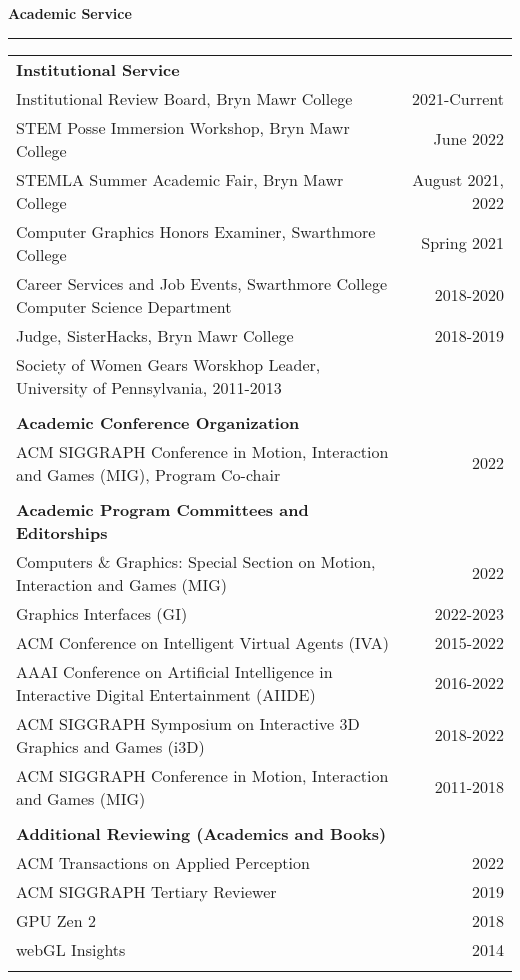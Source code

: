 \needspace{6em}
{\large {\bf Academic Service}}
\vspace{0.1cm}
\hrule
\medskip
\begin{tabular*}{7.1in}{@{}l@{\extracolsep\fill}r}

{\bf Institutional Service } & \\
Institutional Review Board, Bryn Mawr College & 2021-Current \\
STEM Posse Immersion Workshop, Bryn Mawr College & June 2022 \\
STEMLA Summer Academic Fair, Bryn Mawr College & August 2021, 2022 \\
Computer Graphics Honors Examiner, Swarthmore College & Spring 2021 \\
Career Services and Job Events, Swarthmore College Computer Science Department & 2018-2020 \\
Judge, SisterHacks, Bryn Mawr College & 2018-2019 \\
Society of Women Gears Worskhop Leader, University of Pennsylvania, 2011-2013 \\
\phantom{yommomma} & \phantom{2002}\\

{\bf Academic Conference Organization } & \\
ACM SIGGRAPH Conference in Motion, Interaction and Games (MIG), Program Co-chair & 2022 \\
\phantom{yommomma} & \phantom{2002}\\

{\bf Academic Program Committees and Editorships} & \\
Computers \& Graphics: Special Section on Motion, Interaction and Games (MIG)& 2022 \\
Graphics Interfaces (GI)& 2022-2023 \\
ACM Conference on Intelligent Virtual Agents (IVA)& 2015-2022\\
AAAI Conference on Artificial Intelligence in Interactive Digital Entertainment (AIIDE)& 2016-2022 \\
ACM SIGGRAPH Symposium on Interactive 3D Graphics and Games (i3D)& 2018-2022 \\
ACM SIGGRAPH Conference in Motion, Interaction and Games (MIG)& 2011-2018 \\
\phantom{yommomma} & \phantom{2002}\\

{\bf Additional Reviewing (Academics and Books)} & \\
ACM Transactions on Applied Perception & 2022 \\
ACM SIGGRAPH Tertiary Reviewer & 2019 \\
GPU Zen 2 & 2018 \\
webGL Insights & 2014 \\
\phantom{yommomma} & \phantom{2002}\\

\end{tabular*}


